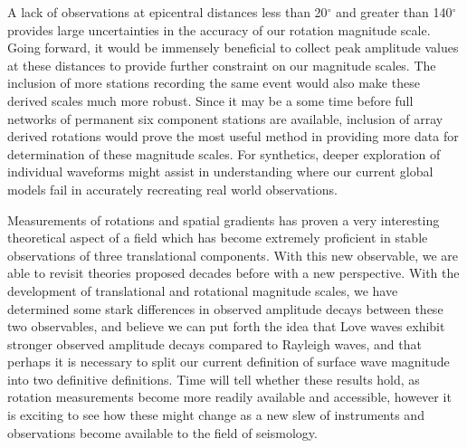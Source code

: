 \documentclass{gji}
\begin{document}
A lack of observations at epicentral distances less than 20$^\circ$ and greater than 140$^\circ$ provides large uncertainties in the accuracy of our rotation magnitude scale. Going forward, it would be immensely beneficial to collect peak amplitude values at these distances to provide further constraint on our magnitude scales. The inclusion of more stations recording the same event would also make these derived scales much more robust. Since it may be a some time before full networks of permanent six component stations are available, inclusion of array derived rotations would prove the most useful method in providing more data for determination of these magnitude scales. For synthetics, deeper exploration of individual waveforms might assist in understanding where our current global models fail in accurately recreating real world observations. 

Measurements of rotations and spatial gradients has proven a very interesting theoretical aspect of a field which has become extremely proficient in stable observations of three translational components. With this new observable, we are able to revisit theories proposed decades before with a new perspective. With the development of translational and rotational magnitude scales, we have determined some stark differences in observed amplitude decays between these two observables, and believe we can put forth the idea that Love waves exhibit stronger observed amplitude decays compared to Rayleigh waves, and that perhaps it is necessary to split our current definition of surface wave magnitude into two definitive definitions. Time will tell whether these results hold, as rotation measurements become more readily available and accessible, however it is exciting to see how these might change as a new slew of instruments and observations become available to the field of seismology. 
\end{document}
